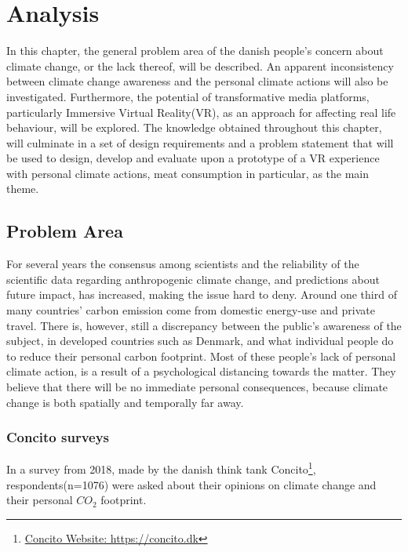 \chapter{Analysis}\label{chap:analysis}
    In this chapter, the general problem area of the danish people's concern about climate change, or the lack thereof, will be described. An apparent inconsistency between climate change awareness and the personal climate actions will also be investigated. Furthermore, the potential of transformative media platforms, particularly Immersive Virtual Reality(VR), as an approach for affecting real life behaviour, will be explored. The knowledge obtained throughout this chapter, will culminate in a set of design requirements and a problem statement that will be used to design, develop and evaluate upon a prototype of a VR experience with personal climate actions, meat consumption in particular, as the main theme.

\section{Problem Area}\label{sec:problemArea}
    For several years the consensus among scientists and the reliability of the scientific data regarding anthropogenic climate change, and predictions about future impact, has increased, making the issue hard to deny\cite{the5Ds, scientistConsensus, publicEngagementUnderstanding}. Around one third of many countries' carbon emission come from domestic energy-use and private travel\cite{reorientingClimageChangeCommunication}. There is, however, still a discrepancy between the public's awareness of the subject, in developed countries such as Denmark, and what individual people do to reduce their personal carbon footprint. Most of these people's lack of personal climate action, is a result of a psychological distancing towards the matter\cite{the5Ds, publicEngagementUnderstanding}. They believe that there will be no immediate personal consequences, because climate change is both spatially and temporally far away\cite{publicEngagementUnderstanding}.
    
    \subsection{Concito surveys}
        In a survey from 2018, made by the danish think tank Concito\footnote{\href{https://concito.dk}{Concito Website: https://concito.dk}}, respondents(n=1076) were asked about their opinions on climate change and their personal ${CO_2}$ footprint.
        
